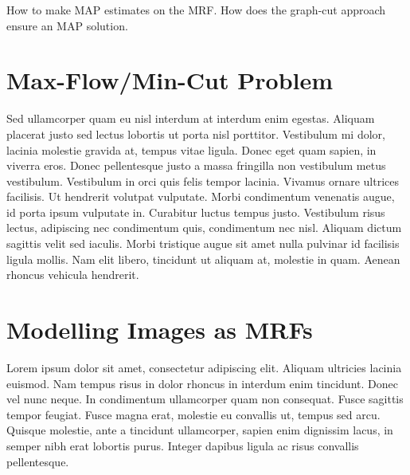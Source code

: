 How to make MAP estimates on the MRF. How does the graph-cut approach ensure an MAP solution.


\section{Max-Flow/Min-Cut Problem}
\label{sec:MaxFlowMinCutProblem}

Sed ullamcorper quam eu nisl interdum at interdum enim egestas. Aliquam placerat justo sed lectus lobortis ut porta nisl porttitor. Vestibulum mi dolor, lacinia molestie gravida at, tempus vitae ligula. Donec eget quam sapien, in viverra eros. Donec pellentesque justo a massa fringilla non vestibulum metus vestibulum. Vestibulum in orci quis felis tempor lacinia. Vivamus ornare ultrices facilisis. Ut hendrerit volutpat vulputate. Morbi condimentum venenatis augue, id porta ipsum vulputate in. Curabitur luctus tempus justo. Vestibulum risus lectus, adipiscing nec condimentum quis, condimentum nec nisl. Aliquam dictum sagittis velit sed iaculis. Morbi tristique augue sit amet nulla pulvinar id facilisis ligula mollis. Nam elit libero, tincidunt ut aliquam at, molestie in quam. Aenean rhoncus vehicula hendrerit.


\section{Modelling Images as MRFs}
\label{sec:MRFImageModelling}

Lorem ipsum dolor sit amet, consectetur adipiscing elit. Aliquam ultricies lacinia euismod. Nam tempus risus in dolor rhoncus in interdum enim tincidunt. Donec vel nunc neque. In condimentum ullamcorper quam non consequat. Fusce sagittis tempor feugiat. Fusce magna erat, molestie eu convallis ut, tempus sed arcu. Quisque molestie, ante a tincidunt ullamcorper, sapien enim dignissim lacus, in semper nibh erat lobortis purus. Integer dapibus ligula ac risus convallis pellentesque.

